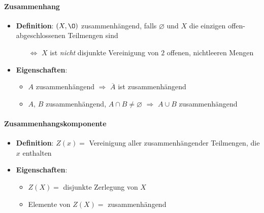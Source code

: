 \paragraph{Zusammenhang}
\begin{itemize}
  \item \textbf{Definition}: \( (X,\O) \) zusammenhängend, falls \( \varnothing \) und \( X \) die einzigen offen-abgeschlossenen Teilmengen sind
  \begin{itemize}
    \item[\( \Leftrightarrow \)] \( X \) ist \emph{nicht} disjunkte Vereinigung von \( 2 \) offenen, nichtleeren Mengen
  \end{itemize}
  \item \textbf{Eigenschaften}:
  \begin{itemize}
    \item \( A \) zusammenhängend \( \Rightarrow \) \( \overline{A} \) ist zusammenhängend
    \item \( A \), \( B \) zusammenhängend, \( A \cap B \neq \varnothing \) \( \Rightarrow \) \( A \cup B \) zusammenhängend
  \end{itemize}  
\end{itemize}

\paragraph{Zusammenhangskomponente}
\begin{itemize}
  \item \textbf{Definition}: \( Z(x) = \) Vereinigung aller zusammenhängender Teilmengen, die \( x \) enthalten
  \item \textbf{Eigenschaften}:
  \begin{itemize}
    \item \( Z(X) =  \) disjunkte Zerlegung von \( X \)
    \item Elemente von \( Z(X) = \) zusammenhängend
  \end{itemize}
\end{itemize}

